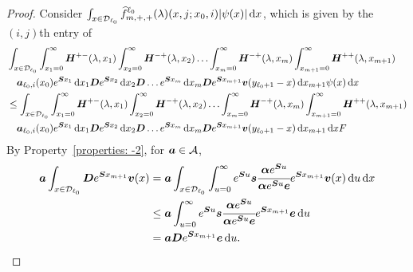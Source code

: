 \begin{proof}
	Consider \(\int_{x\in\mathcal{D}_{\ell_0}}\widehat f^{\ell_0}_{m,+,+}(\lambda)(x,j;x_0,i)|\psi(x)|\, \mathrm{d} x\), which is given by the \((i,j)\)th entry of
        \begin{align}
        	&\int_{x\in\mathcal{D}_{\ell_0}}\int_{x_1=0}^\infty \boldsymbol H^{+-}(\lambda,x_1)\nonumber
	\int_{x_2=0}^\infty \boldsymbol H^{-+}(\lambda,x_2) 
	\hdots \int_{x_m=0}^\infty \boldsymbol H^{-+}(\lambda, x_m) 
	\int_{x_{m+1}=0}^\infty \boldsymbol H^{++}(\lambda,x_{m+1}) 
	\\&\quad\boldsymbol   a_{\ell_0,i}(x_0)e^{\boldsymbol{S}x_1}\, \mathrm{d} x_1 \boldsymbol{D}e^{\boldsymbol{S}x_2} \, \mathrm{d} x_2 \boldsymbol{D}\dots e^{\boldsymbol{S}x_m} \, \mathrm{d} x_m \boldsymbol{D}e^{\boldsymbol{S}x_{m+1}}{\boldsymbol v}(y_{\ell_0+1}-x) \, \mathrm{d} x_{m+1}\psi(x)\, \mathrm{d} x\nonumber
			\\&\leq \int_{x\in\mathcal{D}_{\ell_0}}\int_{x_1=0}^\infty \boldsymbol H^{+-}(\lambda,x_1)\nonumber
			\int_{x_2=0}^\infty \boldsymbol H^{-+}(\lambda,x_2) 
			\hdots \int_{x_m=0}^\infty \boldsymbol H^{-+}(\lambda, x_m) 
			\int_{x_{m+1}=0}^\infty \boldsymbol H^{++}(\lambda,x_{m+1}) 
			\\&\quad\boldsymbol   a_{\ell_0,i}(x_0)e^{\boldsymbol{S}x_1}\, \mathrm{d} x_1 \boldsymbol{D}e^{\boldsymbol{S}x_2} \, \mathrm{d} x_2 \boldsymbol{D}\dots e^{\boldsymbol{S}x_m} \, \mathrm{d} x_m \boldsymbol{D}e^{\boldsymbol{S}x_{m+1}}{\boldsymbol v}(y_{\ell_0+1}-x) \, \mathrm{d} x_{m+1}\, \mathrm{d} x F 
			\label{eqn:llkjhslkj}
	\end{align}
	By Property~\ref{properties: -2}, for \(\boldsymbol a \in \mathcal A\), 
	\begin{align*}
		\boldsymbol a\int_{x\in\mathcal{D}_{\ell_0}}\boldsymbol De^{\boldsymbol Sx_{m+1}}{\boldsymbol v}(x) 
		&= \boldsymbol a\int_{x\in\mathcal{D}_{\ell_0}}\int_{u=0}^\infty e^{\boldsymbol Su}\boldsymbol s\cfrac{\boldsymbol \alpha e^{\boldsymbol S u}}{\boldsymbol \alpha e^{\boldsymbol S u}\boldsymbol e}e^{\boldsymbol Sx_{m+1}}{\boldsymbol v}(x)\, \mathrm{d} u\, \mathrm{d} x
		\\&\leq \boldsymbol a\int_{u=0}^\infty e^{\boldsymbol Su}\boldsymbol s\cfrac{\boldsymbol \alpha e^{\boldsymbol S u}}{\boldsymbol \alpha e^{\boldsymbol S u}\boldsymbol e}e^{\boldsymbol Sx_{m+1}}{\boldsymbol e}\, \mathrm{d} u
		\\&= \boldsymbol a\boldsymbol D e^{\boldsymbol Sx_{m+1}}{\boldsymbol e}\, \mathrm{d} u.
	\end{align*}
	

\end{proof}
